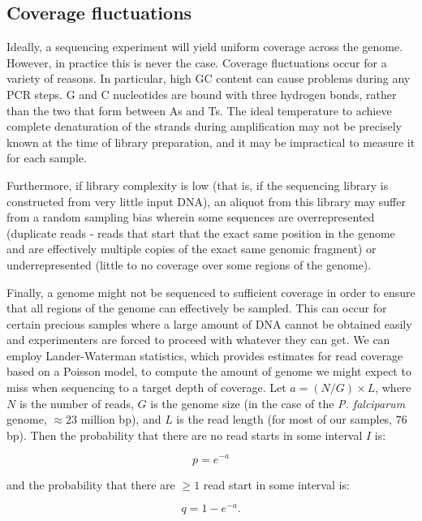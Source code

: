 \subsection{Coverage fluctuations}

Ideally, a sequencing experiment will yield uniform coverage across the genome.  However, in practice this is never the case.  Coverage fluctuations occur for a variety of reasons.  In particular, high GC content can cause problems during any PCR steps.  G and C nucleotides are bound with three hydrogen bonds, rather than the two that form between As and Ts.  The ideal temperature to achieve complete denaturation of the strands during amplification may not be precisely known at the time of library preparation, and it may be impractical to measure it for each sample.

Furthermore, if library complexity is low (that is, if the sequencing library is constructed from very little input DNA), an aliquot from this library may suffer from a random sampling bias wherein some sequences are overrepresented (duplicate reads - reads that start that the exact same position in the genome and are effectively multiple copies of the exact same genomic fragment) or underrepresented (little to no coverage over some regions of the genome).

Finally, a genome might not be sequenced to sufficient coverage in order to ensure that all regions of the genome can effectively be sampled.  This can occur for certain precious samples where a large amount of DNA cannot be obtained easily and experimenters are forced to proceed with whatever they can get.  We can employ Lander-Waterman statistics, which provides estimates for read coverage based on a Poisson model, to compute the amount of genome we might expect to miss when sequencing to a target depth of coverage.  Let $a = (N/G) \times L$, where $N$ is the number of reads, $G$ is the genome size (in the case of the \textit{P. falciparum} genome, $\approx 23$ million bp), and $L$ is the read length (for most of our samples, $76$ bp).  Then the probability that there are no read starts in some interval $I$ is:

\begin{equation}
p = e^{-a}
\end{equation}

\noindent and the probability that there are $\ge 1$ read start in some interval is:

\begin{equation}
q = 1 - e^{-a} .
\end{equation}


